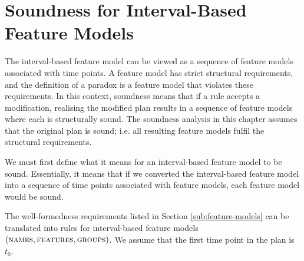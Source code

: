 \section{Soundness for Interval-Based Feature Models}
\label{sec:soundness-for-interval-based-feature-models}
The interval-based feature model can be viewed as a sequence of feature models associated with time points. A feature model has strict structural requirements, and the definition of a paradox is a feature model that violates these requirements. In this context, soundness means that if a rule accepts a modification, realising the modified plan results in a sequence of feature models where each is structurally sound. The soundness analysis in this chapter assumes that the original plan is sound; i.e. all resulting feature models fulfil the structural requirements. 

We must first define what it means for an interval-based feature model to be sound. Essentially, it means that if we converted the interval-based feature model into a sequence of time points associated with feature models, each feature model would be sound.


The well-formedness requirements listed in Section \vref{sub:feature-models} can be translated into rules for interval-based feature models $(\textsc{names},\allowbreak \textsc{features}, \allowbreak \textsc{groups}{})$. We assume that the first time point in the plan is $t_0$.

